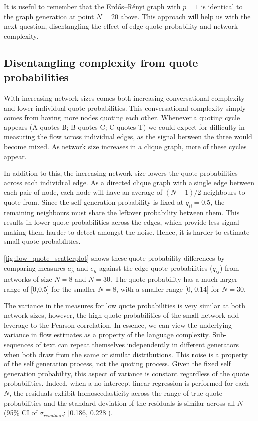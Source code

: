 It is useful to remember that the Erdős–Rényi graph with $p=1$ is identical to the graph generation at point $N=20$ above. This approach will help us with the next question, disentangling the effect of edge quote probability and network complexity.   

\subsection{Disentangling complexity from quote probabilities}\label{sec:low_quote_probs}
With increasing network sizes comes both increasing conversational complexity and lower individual quote probabilities. This conversational complexity simply comes from having more nodes quoting each other. Whenever a quoting cycle appears (A quotes B; B quotes C; C quotes T) we could expect for difficulty in measuring the flow across individual edges, as the signal between the three would become mixed. As network size increases in a clique graph, more of these cycles appear.  

In addition to this, the increasing network size lowers the quote probabilities across each individual edge. As a directed clique graph with a single edge between each pair of node, each node will have an average of $(N-1)/2$ neighbours to quote from. Since the self generation probability is fixed at $q_{ii}=0.5$, the remaining neighbours must share the leftover probability between them. This results in lower quote probabilities across the edges, which provide less signal making them harder to detect amongst the noise. Hence, it is harder to estimate small quote probabilities.

\autoref{fig:flow_quote_scatterplot} shows these quote probability differences by comparing measures $a_{\hat{h}}$ and $e_{\hat{h}}$ against the edge quote probabilities ($q_{ij}$) from networks of size $N=8$ and $N=30$. The quote probability has a much larger range of [0,0.5] for the smaller $N=8$, with a smaller range [0, 0.14] for $N=30$.

The variance in the measures for low quote probabilities is very similar at both network sizes, however, the high quote probabilities of the small network add leverage to the Pearson correlation. In essence, we can view the underlying variance in flow estimates as a property of the language complexity. Sub-sequences of text can repeat themselves independently in different generators when both draw from the same or similar distributions. This noise is a property of the self generation process, not the quoting process. Given the fixed self generation probability, this aspect of variance is constant regardless of the quote probabilities. Indeed, when a no-intercept linear regression is performed for each $N$, the residuals exhibit homoscedasticity across the range of true quote probabilities and the standard deviation of the residuals is similar across all $N$ (95\% CI of $\sigma_{residuals}$: [0.186, 0.228]). 

